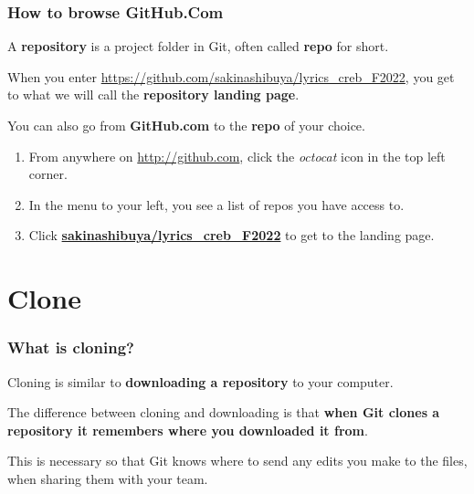 \documentclass[aspectratio=169]{beamer} %
\newcommand*{\img}[1]{%
	\raisebox{-.3\baselineskip}{%
		\texttt{[image: \#1]}%
	}%
}
\newcommand{\trainingURL}[1]{{\color{blue}\url{#1}}}
\newcommand{\traininerUsername}{sakinashibuya}
\newcommand{\repoName}{\traininerUsername/lyrics_creb_F2022}
\newcommand{\trainingRepoURL}[1]{\trainingURL{https://github.com/\repoName #1}}
\begin{document}
\begin{frame}
\frametitle{How to browse GitHub.Com}

	A \textbf{repository} is a project folder in Git, often called \textbf{repo} for short.
	
	When you enter \trainingRepoURL{}, you get to what we will call the \textbf{repository landing page}.

	\vspace{.5cm}

	You can also go from \textbf{GitHub.com} to the \textbf{repo} of your choice.
	\begin{enumerate}
		\item From anywhere on \trainingURL{http://github.com}, click the \textit{octocat}  icon \img{img/octocat.png} in the top left corner.
		\item In the menu to your left, you see a list of repos you have access to.
		\item Click \textbf{\url{\repoName}} to get to the landing page.
	\end{enumerate}
	
\end{frame}

\section{Clone}

\begin{frame}
\frametitle{What is cloning?}

	Cloning is similar to \textbf{downloading a repository} to your computer.

	\vspace{.5cm}

	The difference between cloning and downloading is that \textbf{when Git clones a repository it remembers where you downloaded it from}. 

	\vspace{.5cm}
	
	This is necessary so that Git knows where to send any edits you make to the files, when sharing them with your team.

\end{frame}
\end{document}
